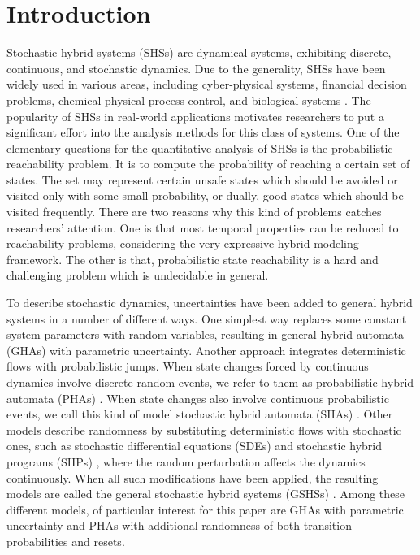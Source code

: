 \section{Introduction} 
Stochastic hybrid systems (SHSs) are dynamical systems, exhibiting discrete, continuous, and stochastic dynamics. Due to the generality, SHSs have been widely used in various areas, including cyber-physical systems, financial decision problems, chemical-physical process control, and biological systems \cite{blom2006stochastic, clarke2011statistical}. The popularity of SHSs in real-world applications motivates researchers to put a significant effort into the analysis methods for this class of systems. One of the elementary questions for the quantitative analysis of SHSs is the probabilistic reachability problem. It is to compute the probability of reaching a certain set of states. The set may represent certain unsafe states which should be avoided or visited only with some small probability, or dually, good states which should be visited frequently. There are two reasons why this kind of problems catches researchers' attention. One is that most temporal properties can be reduced to reachability problems, considering the very expressive hybrid modeling framework. The other is that, probabilistic state reachability is a hard and challenging problem which is undecidable in general. 

To describe stochastic dynamics, uncertainties have been added to general hybrid systems in a number of different ways. One simplest way replaces some constant system parameters with random variables, resulting in general hybrid automata (GHAs) with parametric uncertainty. Another approach integrates deterministic flows with probabilistic jumps. When state changes forced by continuous dynamics involve discrete random events, we refer to them as probabilistic hybrid automata (PHAs) \cite{sproston2000decidable}. When state changes also involve continuous probabilistic events, we call this kind of model stochastic hybrid automata (SHAs) \cite{franzle2011measurability}. Other models describe randomness by substituting deterministic flows with stochastic ones, such as stochastic differential equations (SDEs) \cite{ludwiga1974sde} and stochastic hybrid programs (SHPs) \cite{platzer2011stochastic}, where the random perturbation affects the dynamics continuously. When all such modifications have been applied, the resulting models are called the general stochastic hybrid systems (GSHSs) \cite{hu2000towards}. Among these different models, of particular interest for this paper are GHAs with parametric uncertainty and PHAs with additional randomness of both transition probabilities and resets. 


